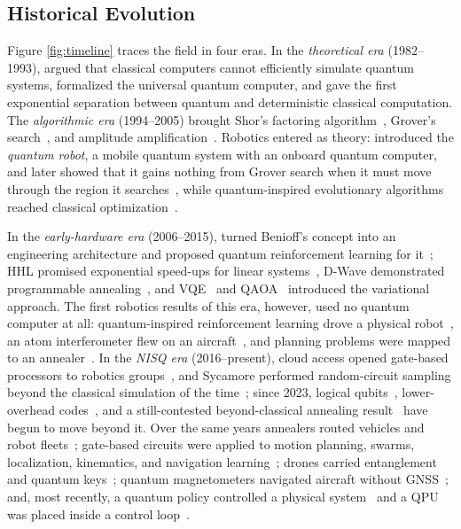 \documentclass[acmsmall,screen,review]{acmart}
\begin{document}
\subsection{Historical Evolution}\label{sec:history}
Figure \ref{fig:timeline} traces the field in four eras. In the \emph{theoretical era} (1982--1993), \citet{Feynman1982} argued that classical computers cannot efficiently simulate quantum systems, \citet{Deutsch1985} formalized the universal quantum computer, and \citet{Deutsch1992} gave the first exponential separation between quantum and deterministic classical computation. The \emph{algorithmic era} (1994--2005) brought Shor's factoring algorithm~\cite{Shor1997}, Grover's search~\cite{Grover1996}, and amplitude amplification~\cite{Brassard2002}. Robotics entered as theory: \citet{Benioff1998} introduced the \emph{quantum robot}, a mobile quantum system with an onboard quantum computer, and later showed that it gains nothing from Grover search when it must move through the region it searches~\cite{Benioff2002}, while quantum-inspired evolutionary algorithms reached classical optimization~\cite{Han2002}.

In the \emph{early-hardware era} (2006--2015), \citet{Dong2006} turned Benioff's concept into an engineering architecture and proposed quantum reinforcement learning for it~\cite{Dong2008}; HHL promised exponential speed-ups for linear systems~\cite{Harrow2009}, D-Wave demonstrated programmable annealing~\cite{Johnson2011}, and VQE~\cite{Peruzzo2014} and QAOA~\cite{Farhi2014} introduced the variational approach. The first robotics results of this era, however, used no quantum computer at all: quantum-inspired reinforcement learning drove a physical robot~\cite{Dong2012}, an atom interferometer flew on an aircraft~\cite{Geiger2011}, and planning problems were mapped to an annealer~\cite{Rieffel2015}. In the \emph{NISQ era} (2016--present), cloud access opened gate-based processors to robotics groups~\cite{Preskill2018}, and Sycamore performed random-circuit sampling beyond the classical simulation of the time~\cite{Arute2019}; since 2023, logical qubits~\cite{Bluvstein2024,GoogleQAI2025}, lower-overhead codes~\cite{Bravyi2024}, and a still-contested beyond-classical annealing result~\cite{King2025} have begun to move beyond it. Over the same years annealers routed vehicles and robot fleets~\cite{Neukart2017,Ohzeki2019,Clark2019,Quang2025}; gate-based circuits were applied to motion planning, swarms, localization, kinematics, and navigation learning~\cite{Chella2022,Chella2023,Antero2025,Otani2025,Hohenfeld2024}; drones carried entanglement and quantum keys~\cite{Liu2021,Tian2023}; quantum magnetometers navigated aircraft without GNSS~\cite{Muradoglu2025}; and, most recently, a quantum policy controlled a physical system~\cite{Sun2025} and a QPU was placed inside a control loop~\cite{Ngo2026}.
\end{document}
